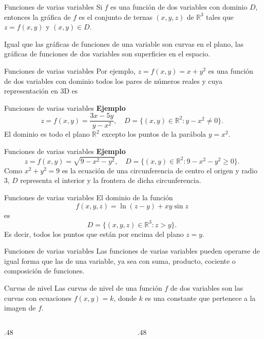 \documentclass[main.tex]{subfiles}
\begin{document}
\begin{frame}{Funciones de varias variables}
\small Si $f$ es una función de dos variables con dominio $D$, entonces la gráfica de $f$ es el conjunto de ternas $(x,y,z)$ de $\mathbb{R}^3$ tales que $z=f(x,y)$ y $(x,y)\in D$.
\medskip

Igual que las gráficas de funciones de una variable son curvas en el plano, las gráficas de funciones de dos variables son superficies en el espacio.
\end{frame}
\begin{frame}{Funciones de varias variables}
Por ejemplo, $z=f(x,y)=x+y^2$ es una función de dos variables con dominio todos los pares de números reales y cuya representación en 3D es
\end{frame}
\begin{frame}{Funciones de varias variables}
\textbf{Ejemplo}
\[z=f(x,y)=\frac{3x-5y}{y-x^2},\quad D=\{(x,y)\in\mathbb{R}^2:y-x^2\ne0\}.\]
El dominio es todo el plano $\mathbb{R}^2$ excepto los puntos de la parábola $y=x^2$.
\end{frame}
\begin{frame}{Funciones de varias variables}
\textbf{Ejemplo}
\[z=f(x,y)=\sqrt{9-x^2-y^2},\quad D=\{(x,y)\in\mathbb{R}^2:9-x^2-y^2\ge0\}.\]
\small Como $x^2+y^2=9$ es la ecuación de una circunferencia de centro el origen y radio $3$, $D$ representa el interior y la frontera de dicha circunferencia.
\end{frame}
\begin{frame}{Funciones de varias variables}
El dominio de la función
\[f(x,y,z)=\ln(z-y)+xy\sin z\]
es
\[D=\{(x,y,z)\in\mathbb{R}^3:z>y\}.\]
Es decir, todos los puntos que están por encima del plano $z=y$.
\end{frame}
\begin{frame}{Funciones de varias variables}
Las funciones de varias variables pueden operarse de igual forma que las de una variable, ya sea con suma, producto, cociente o composición de funciones.
\end{frame}
\begin{frame}{Curvas de nivel}
Las curvas de nivel de una función $f$ de dos variables son las curvas con ecuaciones $f(x,y)=k$, donde $k$ es una constante que pertenece a la imagen de $f$.
\begin{columns}[c]
\begin{column}{.48\textwidth}\end{column}
\begin{column}{.48\textwidth}\end{column}
\end{columns}
\end{frame}
\end{document}
